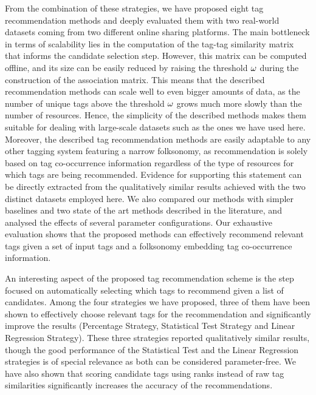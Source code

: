 From the combination of these strategies, we have proposed eight tag recommendation methods and deeply evaluated them with two real-world datasets coming from two different online sharing platforms.
The main bottleneck in terms of scalability lies in the computation of the tag-tag similarity matrix that informs the candidate selection step. However, this matrix can be computed offline, and its size can be easily reduced by raising the threshold $\omega$ during the construction of the association matrix. This means that the described recommendation methods can scale well to even bigger amounts of data, as the number of unique tags above the threshold $\omega$ grows much more slowly than the number of resources.
Hence, the simplicity of the described methods makes them suitable for dealing with large-scale datasets such as the ones we have used here.
Moreover, the described tag recommendation methods are easily adaptable to any other tagging system featuring a narrow folksonomy, as recommendation is solely based on tag co-occurrence information regardless of the type of resources for which tags are being recommended. Evidence for supporting this statement can be directly extracted from the qualitatively similar results achieved with the two distinct datasets employed here.
We also compared our methods with simpler baselines and two state of the art methods described in the literature, and analysed the effects of several parameter configurations. Our exhaustive evaluation shows that the proposed methods can effectively recommend relevant tags given a set of input tags and a folksonomy embedding tag co-occurrence information.

An interesting aspect of the proposed tag recommendation scheme is the step focused on automatically selecting which tags to recommend given a list of candidates. 
Among the four strategies we have proposed, three of them  have been shown to effectively choose relevant tags for the recommendation and significantly improve the results (Percentage Strategy, Statistical Test Strategy and Linear Regression Strategy). These three strategies reported qualitatively similar results, though the good performance of the Statistical Test and the Linear Regression strategies is of special relevance as both can be considered parameter-free. We have also shown that scoring candidate tags using ranks instead of raw tag similarities significantly increases the accuracy of the recommendations.

